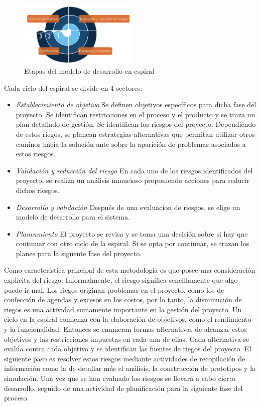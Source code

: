 \begin{figure}[h!]
 \begin{center}
  \includegraphics[width=0.5\textwidth,keepaspectratio=true]{./images/ESPIRAL}
  \caption{Etapas del modelo de desarrollo en espiral}
  \label{fig:esquema}
 \end{center}
\end{figure}

Cada ciclo del espiral se divide en 4 sectores:
 
\begin {itemize}
\item 
\textit{Establecimiento de objetivo}  Se definen objetivos específicos para dicha fase del proyecto. Se identifican restricciones en el proceso y el
producto y se traza un plan detallado de gestión. Se identifican los riesgos del proyecto. Dependiendo de estos riegos, se planean estrategias
alternativas que permitan utilizar otros caminos hacia la solución ante sobre la aparición de problemas asociados a estos riesgos.
\item 
\textit{Validación y reducción del riesgo}  En cada uno de los riesgos identificados del proyecto, se realiza un análisis minucioso proponiendo
acciones para reducir dichos riesgos.
\item 
\textit{Desarrollo y validación}  Después de una evaluacion de riesgos, se elige un modelo de desarrollo para el sistema.
\item 
\textit{Planeamiento}  El proyecto se revisa y se toma una decisión sobre si hay que continuar con otro ciclo de la espiral. Si se opta por continuar,
se trazan los planes para la siguente fase del proyecto.
\end {itemize}

Como característica principal de esta metodología es que posee una consideración explícita del riesgo. Informalmente, el riesgo significa
sencillamente que algo puede ir mal. Los riegos originan problemas en el proyecto, como los de confección de agendas y excesos en los costos, por lo
tanto, la disminución de riegos es una actividad sumamente importante en la gestión del proyecto. Un ciclo en la espiral comienza con la elaboración
de objetivos, como el rendimiento y la funcionalidad. Entonces se enumeran formas alternativas de alcanzar estos objetivos y las restricciones
impuestas en cada una de ellas. Cada alternativa se evalúa contra cada objetivo y se identifican las fuentes de riegos del proyecto. El siguiente
paso es resolver estos riesgos mediante actividades de recopilación de información como la de detallar más el análisis, la construcción de prototipos
y la simulación. Una vez que se han evaluado los riesgos se llevará a cabo cierto desarrollo, seguido de una actividad de planificación para la
siguiente fase del proceso.

